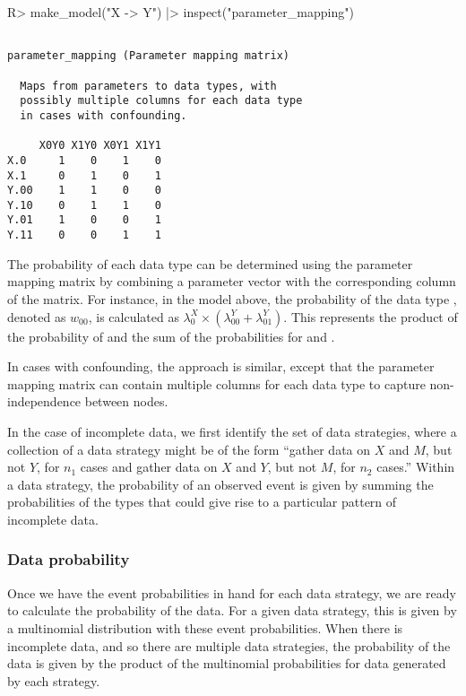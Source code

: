 \documentclass[
  11pt,
  article]{jss}
\renewcommand{\texttt}[1]{\code{#1}}
\begin{document}
\begin{CodeInput}
R> make_model("X -> Y") |> inspect("parameter_mapping") 
\end{CodeInput}

\begin{verbatim}

parameter_mapping (Parameter mapping matrix) 

  Maps from parameters to data types, with
  possibly multiple columns for each data type
  in cases with confounding. 

     X0Y0 X1Y0 X0Y1 X1Y1
X.0     1    0    1    0
X.1     0    1    0    1
Y.00    1    1    0    0
Y.10    0    1    1    0
Y.01    1    0    0    1
Y.11    0    0    1    1
\end{verbatim}

The probability of each data type can be determined using the parameter
mapping matrix by combining a parameter vector with the corresponding
column of the matrix. For instance, in the model above, the probability
of the data type \texttt{X0Y0}, denoted as \(w_{00}\), is calculated as
\(\lambda^X_0 \times (\lambda^Y_{00} + \lambda^Y_{01})\). This
represents the product of the probability of \texttt{X.0} and the sum of
the probabilities for \texttt{Y.00} and \texttt{Y.01}.

In cases with confounding, the approach is similar, except that the
parameter mapping matrix can contain multiple columns for each data type
to capture non-independence between nodes.

In the case of incomplete data, we first identify the set of data
strategies, where a collection of a data strategy might be of the form
``gather data on \(X\) and \(M\), but not \(Y\), for \(n_1\) cases and
gather data on \(X\) and \(Y\), but not \(M\), for \(n_2\) cases.''
Within a data strategy, the probability of an observed event is given by
summing the probabilities of the types that could give rise to a
particular pattern of incomplete data.

\subsubsection{Data probability}\label{data-probability}

Once we have the event probabilities in hand for each data strategy, we
are ready to calculate the probability of the data. For a given data
strategy, this is given by a multinomial distribution with these event
probabilities. When there is incomplete data, and so there are multiple
data strategies, the probability of the data is given by the product of
the multinomial probabilities for data generated by each strategy.
\end{document}
